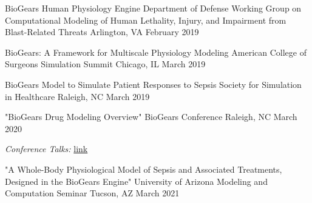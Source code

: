 \begin{cventries}
  \cventry
    {BioGears Human Physiology Engine} %
    {Department of Defense Working Group on Computational Modeling of Human Lethality, Injury, and Impairment from Blast-Related Threats} %
    {Arlington, VA} %
    {February 2019} %
    {
    }


  \cventry
    {BioGears: A Framework for Multiscale Physiology Modeling} %
    {American College of Surgeons Simulation Summit} %
    {Chicago, IL} %
    {March 2019} %
    {
    }

  \cventry
    {BioGears Model to Simulate Patient Responses to Sepsis} %
    {Society for Simulation in Healthcare} %
    {Raleigh, NC} %
    {March 2019} %
    {
    }


  \cventry
    {"BioGears Drug Modeling Overview"} %
    {BioGears Conference} %
    {Raleigh, NC} %
    {March 2020} %
     {
    \begin{cvitems} %
    \item {\textit{Conference Talks:} \href{https://www.youtube.com/channel/UCJB9TkmUbLyyXEFc4waJzDg}{link}}
    \end{cvitems}
     }



  \cventry
    {"A Whole-Body Physiological Model of Sepsis and Associated Treatments, Designed in the
BioGears Engine"} %
    {University of Arizona Modeling and Computation Seminar} %
    {Tucson, AZ} %
    {March 2021} %
     {
     }


\end{cventries}
